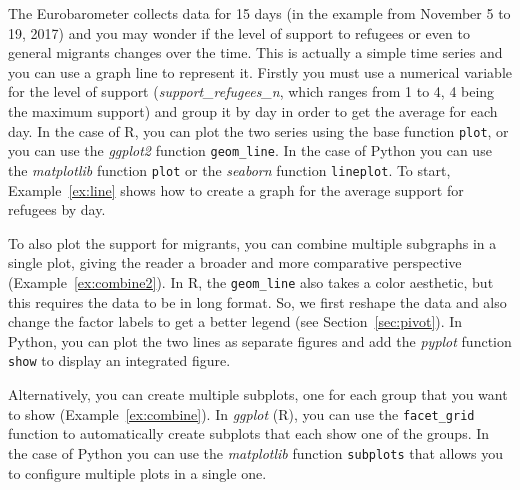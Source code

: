 The Eurobarometer collects data for 15 days (in the example from November 5 to 19, 2017) and you may wonder if the level of support to refugees or even to general migrants changes over the time. This is actually a simple time series and you can use a graph line to represent it. Firstly you must use a numerical variable for the level of support (\emph{support\_refugees\_n}, which ranges from 1 to 4, 4 being the maximum support) and group it by day in order to get the average for each day. In the case of R, you can plot the two series using the base function \texttt{plot}, or you can use the \emph{ggplot2} function \texttt{geom\_line}. In the case of Python you can use the \emph{matplotlib} function \texttt{plot} or the \emph{seaborn} function \texttt{lineplot}. To start, Example~\ref{ex:line} shows how to create a graph for the average support for refugees by day.



To also plot the support for migrants, you can combine multiple subgraphs in a single plot,
giving the reader a broader and more comparative perspective (Example~\ref{ex:combine2}).
In R, the \texttt{geom\_line} also takes a color aesthetic, but this requires the data to be in long format.
So, we first reshape the data and also change the factor labels to get a better legend (see Section~\ref{sec:pivot}).
In Python, you can plot the two lines as separate figures  and add the \emph{pyplot} function \texttt{show} to display an integrated figure.


Alternatively, you can create multiple subplots, one for each group that you want to show (Example~\ref{ex:combine}).
In \emph{ggplot} (R), you can use the \texttt{facet\_grid} function to automatically create subplots that each show one of the groups. In the case of Python you can use the \emph{matplotlib} function \texttt{subplots} that allows you to configure multiple plots in a single one.


